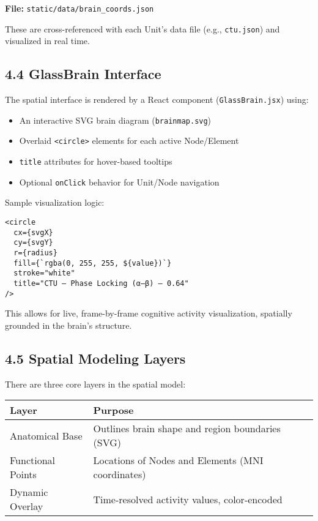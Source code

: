 \textbf{File:} \texttt{static/data/brain\_coords.json}

These are cross-referenced with each Unit’s data file (e.g., \texttt{ctu.json}) and visualized in real time.

\subsection*{4.4 GlassBrain Interface}

The spatial interface is rendered by a React component (\texttt{GlassBrain.jsx}) using:

\begin{itemize}
    \item An interactive SVG brain diagram (\texttt{brainmap.svg})
    \item Overlaid \texttt{<circle>} elements for each active Node/Element
    \item \texttt{title} attributes for hover-based tooltips
    \item Optional \texttt{onClick} behavior for Unit/Node navigation
\end{itemize}

Sample visualization logic:

\begin{verbatim}
<circle
  cx={svgX}
  cy={svgY}
  r={radius}
  fill={`rgba(0, 255, 255, ${value})`}
  stroke="white"
  title="CTU – Phase Locking (α–β) – 0.64"
/>
\end{verbatim}

This allows for live, frame-by-frame cognitive activity visualization, spatially grounded in the brain’s structure.

\subsection*{4.5 Spatial Modeling Layers}

There are three core layers in the spatial model:

\begin{center}
\begin{tabular}{|l|p{9cm}|}
\hline
\textbf{Layer} & \textbf{Purpose} \\
\hline
Anatomical Base & Outlines brain shape and region boundaries (SVG) \\
Functional Points & Locations of Nodes and Elements (MNI coordinates) \\
Dynamic Overlay & Time-resolved activity values, color-encoded \\
\hline
\end{tabular}
\end{center}

